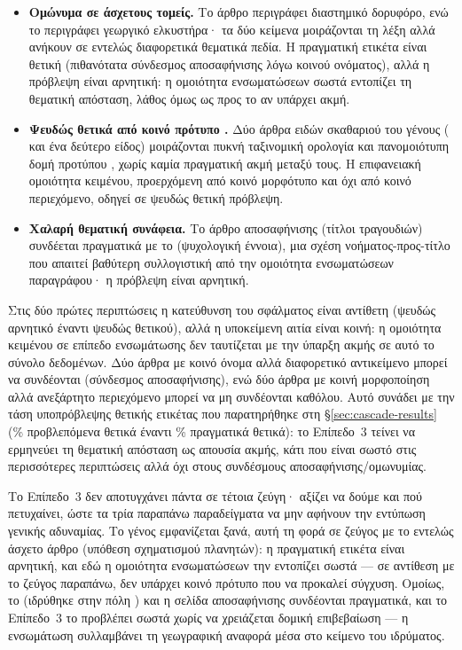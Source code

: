 \begin{itemize}
  \item \textbf{Ομώνυμα σε άσχετους τομείς.} Το άρθρο  περιγράφει
  διαστημικό δορυφόρο, ενώ το  περιγράφει γεωργικό ελκυστήρα· τα δύο
  κείμενα μοιράζονται τη λέξη  αλλά ανήκουν σε εντελώς διαφορετικά
  θεματικά πεδία.
  Η πραγματική ετικέτα είναι θετική (πιθανότατα σύνδεσμος
  αποσαφήνισης λόγω κοινού ονόματος), αλλά η πρόβλεψη είναι αρνητική: η ομοιότητα
  ενσωματώσεων σωστά εντοπίζει τη θεματική απόσταση, λάθος όμως ως προς το αν
  υπάρχει ακμή.
  \item \textbf{Ψευδώς θετικά από κοινό πρότυπο .} Δύο άρθρα ειδών
  σκαθαριού του γένους  ( και ένα δεύτερο
  είδος) μοιράζονται πυκνή ταξινομική ορολογία και πανομοιότυπη δομή προτύπου
  , χωρίς καμία πραγματική ακμή μεταξύ τους.
  Η επιφανειακή ομοιότητα
  κειμένου, προερχόμενη από κοινό μορφότυπο και όχι από κοινό περιεχόμενο, οδηγεί σε
  ψευδώς θετική πρόβλεψη.
  \item \textbf{Χαλαρή θεματική συνάφεια.} Το άρθρο αποσαφήνισης 
  (τίτλοι τραγουδιών) συνδέεται πραγματικά με το  (ψυχολογική
  έννοια), μια σχέση νοήματος-προς-τίτλο που απαιτεί βαθύτερη συλλογιστική από την
  ομοιότητα ενσωματώσεων παραγράφου· η πρόβλεψη είναι αρνητική.
\end{itemize}

Στις δύο πρώτες περιπτώσεις η κατεύθυνση του σφάλματος είναι αντίθετη (ψευδώς αρνητικό
έναντι ψευδώς θετικού), αλλά η υποκείμενη αιτία είναι κοινή: η ομοιότητα κειμένου σε
επίπεδο ενσωμάτωσης δεν ταυτίζεται με την ύπαρξη ακμής σε αυτό το σύνολο δεδομένων.
Δύο άρθρα με κοινό όνομα αλλά διαφορετικό αντικείμενο μπορεί να συνδέονται (σύνδεσμος
αποσαφήνισης), ενώ δύο άρθρα με κοινή μορφοποίηση  αλλά ανεξάρτητο
περιεχόμενο μπορεί να μη συνδέονται καθόλου.
Αυτό συνάδει με την τάση υποπρόβλεψης
θετικής ετικέτας που παρατηρήθηκε στη \S\ref{sec:cascade-results} (\TierThreePredPosPct\%
προβλεπόμενα θετικά έναντι \TierThreeTruePosPct\% πραγματικά θετικά): το Επίπεδο~3 τείνει να
ερμηνεύει τη θεματική απόσταση ως απουσία ακμής, κάτι που είναι σωστό στις
περισσότερες περιπτώσεις αλλά όχι στους συνδέσμους αποσαφήνισης/ομωνυμίας.

Το Επίπεδο~3 δεν αποτυγχάνει πάντα σε τέτοια ζεύγη· αξίζει να δούμε και πού
πετυχαίνει, ώστε τα τρία παραπάνω παραδείγματα να μην αφήνουν την εντύπωση
γενικής αδυναμίας. Το γένος  εμφανίζεται ξανά, αυτή τη φορά σε
ζεύγος με το εντελώς άσχετο άρθρο  (υπόθεση σχηματισμού
πλανητών): η πραγματική ετικέτα είναι αρνητική, και εδώ η ομοιότητα
ενσωματώσεων την εντοπίζει σωστά --- σε αντίθεση με το ζεύγος 
παραπάνω, δεν υπάρχει κοινό πρότυπο  που να προκαλεί σύγχυση. Ομοίως,
το  (ιδρύθηκε στην πόλη ) και
η σελίδα αποσαφήνισης  συνδέονται πραγματικά, και το Επίπεδο~3
το προβλέπει σωστά χωρίς να χρειάζεται δομική επιβεβαίωση --- η ενσωμάτωση
συλλαμβάνει τη γεωγραφική αναφορά μέσα στο κείμενο του ιδρύματος.

